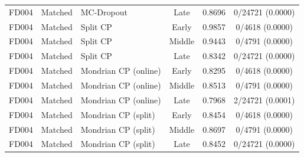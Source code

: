 \begin{table}[t]
\begin{tabular}{lllccc}
FD004 & Matched & MC-Dropout & Late & 0.8696 & 0/24721 (0.0000) \\
FD004 & Matched & Split CP & Early & 0.9857 & 0/4618 (0.0000) \\
FD004 & Matched & Split CP & Middle & 0.9443 & 0/4791 (0.0000) \\
FD004 & Matched & Split CP & Late & 0.8342 & 0/24721 (0.0000) \\
FD004 & Matched & Mondrian CP (online) & Early & 0.8295 & 0/4618 (0.0000) \\
FD004 & Matched & Mondrian CP (online) & Middle & 0.8513 & 0/4791 (0.0000) \\
FD004 & Matched & Mondrian CP (online) & Late & 0.7968 & 2/24721 (0.0001) \\
FD004 & Matched & Mondrian CP (split) & Early & 0.8454 & 0/4618 (0.0000) \\
FD004 & Matched & Mondrian CP (split) & Middle & 0.8697 & 0/4791 (0.0000) \\
FD004 & Matched & Mondrian CP (split) & Late & 0.8452 & 0/24721 (0.0000) \\
\bottomrule
\end{tabular}
\end{table}
